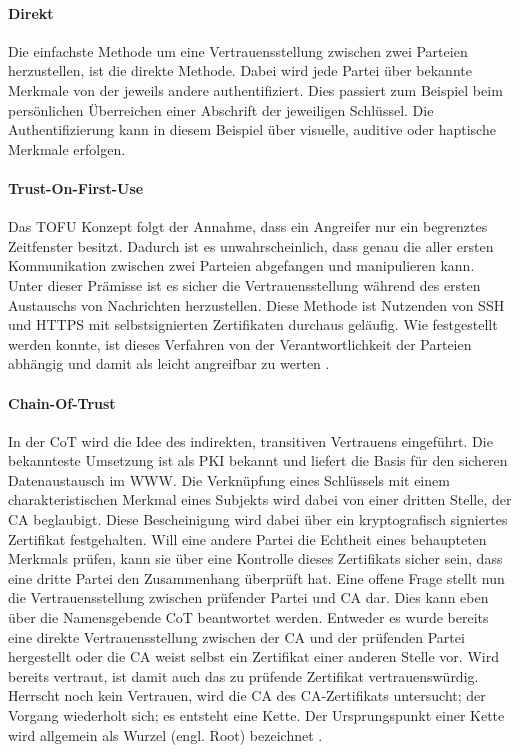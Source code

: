 \paragraph{Direkt}
Die einfachste Methode um eine Vertrauensstellung zwischen zwei Parteien herzustellen, ist die direkte Methode. Dabei wird jede Partei über bekannte Merkmale von der jeweils andere authentifiziert. Dies passiert zum Beispiel beim persönlichen Überreichen einer Abschrift der jeweiligen Schlüssel. Die Authentifizierung kann in diesem Beispiel über visuelle, auditive oder haptische Merkmale erfolgen.

\paragraph{Trust-On-First-Use}
Das \ac{TOFU} Konzept folgt der Annahme, dass ein Angreifer nur ein begrenztes Zeitfenster besitzt. Dadurch ist es unwahrscheinlich, dass genau die aller ersten Kommunikation zwischen zwei Parteien abgefangen und manipulieren kann. Unter dieser Prämisse ist es sicher die Vertrauensstellung während des ersten Austauschs von Nachrichten herzustellen. Diese Methode ist Nutzenden von \ac{SSH} und \acs{HTTPS} mit selbstsignierten Zertifikaten durchaus geläufig. Wie festgestellt werden konnte, ist dieses Verfahren von der Verantwortlichkeit der Parteien abhängig und damit als leicht angreifbar zu werten \cite{Wendlandt2008}.

\paragraph{Chain-Of-Trust}
In der \ac{CoT} wird die Idee des indirekten, transitiven Vertrauens eingeführt. Die bekannteste Umsetzung ist als \ac{PKI} bekannt und liefert die Basis für den sicheren Datenaustausch im \ac{WWW}. Die Verknüpfung eines Schlüssels mit einem charakteristischen Merkmal eines Subjekts wird dabei von einer dritten Stelle, der \ac{CA} beglaubigt. Diese Bescheinigung wird dabei über ein kryptografisch signiertes Zertifikat festgehalten. Will eine andere Partei die Echtheit eines behaupteten Merkmals prüfen, kann sie über eine Kontrolle dieses Zertifikats sicher sein, dass eine dritte Partei den Zusammenhang überprüft hat. Eine offene Frage stellt nun die Vertrauensstellung zwischen prüfender Partei und \ac{CA} dar. Dies kann eben über die Namensgebende \ac{CoT} beantwortet werden. Entweder es wurde bereits eine direkte Vertrauensstellung zwischen der \ac{CA} und der prüfenden Partei hergestellt oder die \ac{CA} weist selbst ein Zertifikat einer anderen Stelle vor. Wird bereits vertraut, ist damit auch das zu prüfende Zertifikat vertrauenswürdig. Herrscht noch kein Vertrauen, wird die \ac{CA} des CA-Zertifikats untersucht; der Vorgang wiederholt sich; es entsteht eine Kette. Der Ursprungspunkt einer Kette wird allgemein als Wurzel (engl. Root) bezeichnet \cite[p. 423 ff.]{Eckert2013}.  
